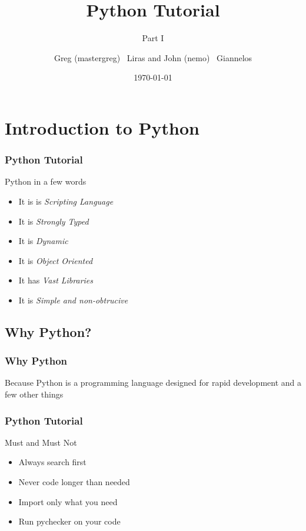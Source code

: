 \documentclass{beamer}
\author[nemo,mastergreg]{Greg (mastergreg) ~Liras and John (nemo)
~Giannelos}
\institute{foss.ntua}
\title{Python Tutorial}
\subtitle{Part I}
\date{\today}
\begin{document}
\frame{\titlepage}
\section[Intro]{}
\frame{\tableofcontents}

\section{Introduction to Python}
\begin{frame}
	\frametitle{Python Tutorial}

Python in a few words

\begin{itemize}
\item<1-> It is is \emph{Scripting Language}
\item<2-> It is \emph{Strongly Typed}
\item<3-> It is \emph{Dynamic}
\item<4-> It is \emph{Object Oriented}
\item<5-> It has \emph{Vast Libraries}
\item<6-> It is \emph{Simple and non-obtrucive}
\end{itemize}

\end{frame}

\subsection{Why Python?}
\begin{frame}
	\frametitle{Why Python}
	Because Python is a programming language 
	designed for rapid development
	and a few other things
\end{frame}
\begin{frame}
	\frametitle{Python Tutorial}

Must and Must Not

\begin{itemize}
\item<1-> Always search first
\item<2-> Never code longer than needed
\item<3-> Import only what you need
\item<4-> Run pychecker on your code
\end{itemize}

\end{frame}
\end{document}
